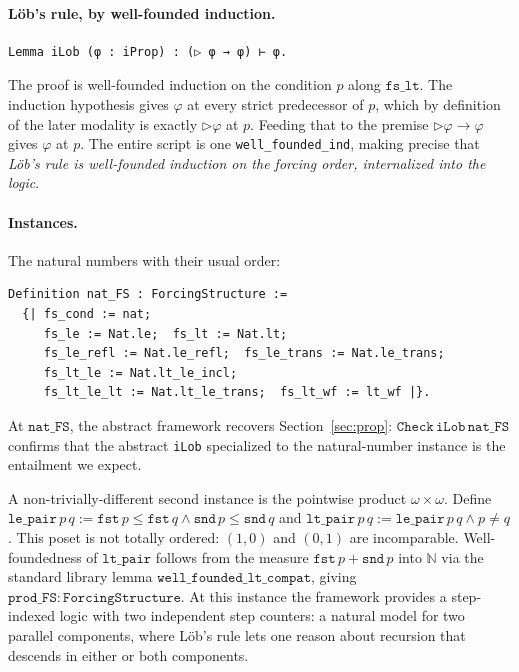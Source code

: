 \paragraph{Löb's rule, by well-founded induction.}
\begin{lstlisting}
Lemma iLob (φ : iProp) : (▷ φ → φ) ⊢ φ.
\end{lstlisting}
\noindent
The proof is well-founded induction on the condition $p$ along
$\mathtt{fs\_lt}$.  The induction hypothesis gives $\varphi$ at every
strict predecessor of $p$, which by definition of the later modality
is exactly $\triangleright \varphi$ at $p$.  Feeding that to the
premise $\triangleright \varphi \to \varphi$ gives $\varphi$ at $p$.
The entire script is one \texttt{well\_founded\_ind}, making precise
that \emph{Löb's rule is well-founded induction on the forcing order,
internalized into the logic}.

\paragraph{Instances.}
The natural numbers with their usual order:
\begin{lstlisting}
Definition nat_FS : ForcingStructure :=
  {| fs_cond := nat;
     fs_le := Nat.le;  fs_lt := Nat.lt;
     fs_le_refl := Nat.le_refl;  fs_le_trans := Nat.le_trans;
     fs_lt_le := Nat.lt_le_incl;
     fs_lt_le_lt := Nat.lt_le_trans;  fs_lt_wf := lt_wf |}.
\end{lstlisting}
\noindent
At $\mathtt{nat\_FS}$, the abstract framework recovers
Section~\ref{sec:prop}: $\mathtt{Check}\, \mathtt{iLob}\, \mathtt{nat\_FS}$
confirms that the abstract \texttt{iLob} specialized to the
natural-number instance is the entailment we expect.

A non-trivially-different second instance is the pointwise product
$\omega \times \omega$.  Define
$\mathtt{le\_pair}\, p\, q := \mathtt{fst}\, p \le \mathtt{fst}\, q \wedge \mathtt{snd}\, p \le \mathtt{snd}\, q$
and $\mathtt{lt\_pair}\, p\, q := \mathtt{le\_pair}\, p\, q \wedge p \neq q$.
This poset is not totally ordered: $(1,0)$ and $(0,1)$ are
incomparable.  Well-foundedness of $\mathtt{lt\_pair}$ follows from
the measure $\mathtt{fst}\, p + \mathtt{snd}\, p$ into $\mathbb{N}$
via the standard library lemma $\mathtt{well\_founded\_lt\_compat}$,
giving $\mathtt{prod\_FS} : \mathtt{ForcingStructure}$.  At this
instance the framework provides a step-indexed logic with two
independent step counters: a natural model for two parallel
components, where Löb's rule lets one reason about recursion that
descends in either or both components.

